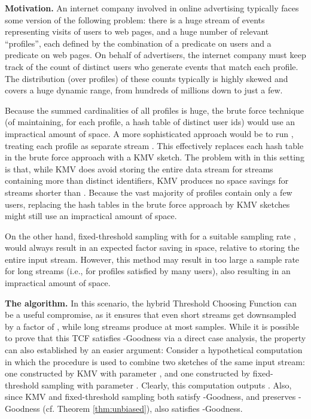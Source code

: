 \documentclass{article}
\begin{document}
\label{app:pkmv}
\noindent \textbf{Motivation.}
An internet company involved in online advertising typically faces
some version of the following problem: there is a huge stream of
events representing visits of users to web pages, and a huge
number of relevant ``profiles'', each defined by the combination of a predicate
on users and a predicate on web pages. On behalf of advertisers, the
internet company must keep track of the count of distinct users
who generate events that match each profile. The distribution (over profiles)
of these counts typically is highly skewed and covers a huge dynamic
range, from hundreds of millions down to just a few.

Because the summed cardinalities of all profiles is huge, the brute
force technique (of maintaining, for each profile, a hash table of distinct user ids) would use an impractical amount of space.  
A more sophisticated approach would be to run ,
treating each profile as separate stream . This effectively replaces each hash table in the brute force approach with a KMV sketch.
The problem with  in this setting is that, while KMV does avoid storing the entire data stream for streams containing more than  distinct identifiers, KMV
produces no space savings for streams shorter than . 
Because the vast majority of profiles contain only a few users, replacing the hash tables in the brute force approach by KMV
sketches might still use an impractical amount of space.


On the other hand, fixed-threshold sampling with  for a suitable sampling rate , would
always result in an expected factor  saving in space, relative to storing the entire input stream. 
However, this method may result in too large a sample rate for long streams (i.e., for profiles satisfied by many users), also resulting in an impractical amount of space.


\noindent \textbf{The  algorithm.} In this scenario, the hybrid Threshold Choosing Function  can be a useful compromise, as it ensures that even short streams get downsampled by a factor of ,
while long streams produce at most  samples. 
While it is possible to
prove that this TCF satisfies -Goodness via a direct case analysis, the property
can also established by an easier argument: Consider a hypothetical
computation in which the  procedure is used to combine two
sketches of the same input stream: one constructed by KMV with
parameter , and one constructed by fixed-threshold sampling with
parameter .  Clearly, this computation outputs . Also, since KMV and fixed-threshold sampling both
satisfy -Goodness, and  preserves -Goodness (cf. Theorem \ref{thm:unbiased}),  also satisfies -Goodness.
\end{document}
